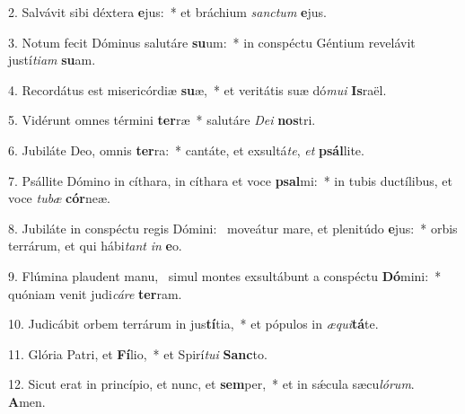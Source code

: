 2. Salvávit sibi déxtera \textbf{e}jus:~*  et bráchium \textit{sanc}\textit{tum} \textbf{e}jus.\

3. Notum fecit Dóminus salutáre \textbf{su}um:~*  in conspéctu Géntium revelávit justí\textit{ti}\textit{am} \textbf{su}am.\

4. Recordátus est misericórdiæ \textbf{su}æ,~*  et veritátis suæ dó\textit{mu}\textit{i} \textbf{Is}raël.\

5. Vidérunt omnes términi \textbf{ter}ræ~*  salutáre \textit{De}\textit{i} \textbf{nos}tri.\

6. Jubiláte Deo, omnis \textbf{ter}ra:~*  cantáte, et exsultá\textit{te}, \textit{et} \textbf{psál}lite.\

7. Psállite Dómino in cíthara, in cíthara et voce \textbf{psal}mi:~*  in tubis ductílibus, et voce \textit{tu}\textit{bæ} \textbf{cór}neæ.\

8. Jubiláte in conspéctu regis Dómini: \dag\  moveátur mare, et plenitúdo \textbf{e}jus:~*  orbis terrárum, et qui hábi\textit{tant} \textit{in} \textbf{e}o.\

9. Flúmina plaudent manu, \dag\  simul montes exsultábunt a conspéctu \textbf{Dó}mini:~*  quóniam venit judi\textit{cá}\textit{re} \textbf{ter}ram.\

10. Judicábit orbem terrárum in jus\textbf{tí}tia,~*  et pópulos in \textit{æ}\textit{qui}\textbf{tá}te.\

11. Glória Patri, et \textbf{Fí}lio,~*  et Spirí\textit{tu}\textit{i} \textbf{Sanc}to.\

12. Sicut erat in princípio, et nunc, et \textbf{sem}per,~*  et in sǽcula sæcu\textit{ló}\textit{rum}. \textbf{A}men.\

